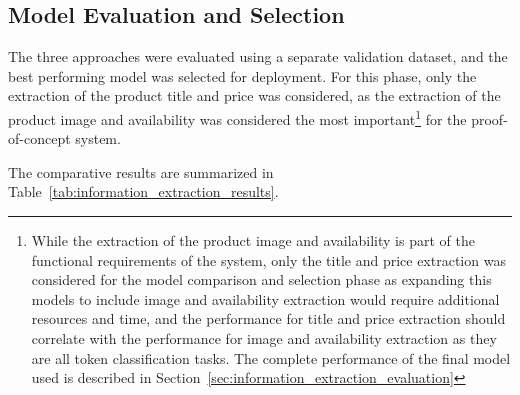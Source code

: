 \subsection{Model Evaluation and Selection}\label{subsec:information_extraction_model_evaluation}
The three approaches were evaluated using a separate validation dataset, and the best performing model was selected for deployment.
For this phase, only the extraction of the product title and price was considered, as the extraction of the product image and availability was considered the most important\footnote{While the extraction of the product image and availability is part of the functional requirements of the system, only the title and price extraction was considered for the model comparison and selection phase as expanding this models to include image and availability extraction would require additional resources and time, and the performance for title and price extraction should correlate with the performance for image and availability extraction as they are all token classification tasks. The complete performance of the final model used is described in Section~\ref{sec:information_extraction_evaluation}} for the proof-of-concept system.

The comparative results are summarized in Table~\ref{tab:information_extraction_results}.

